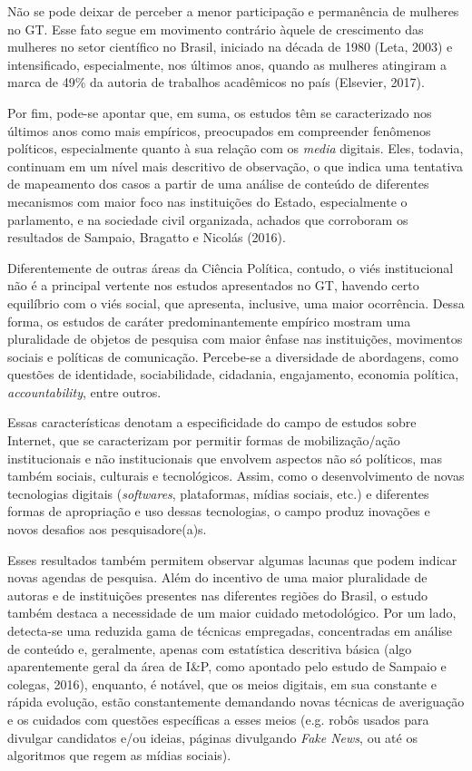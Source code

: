 Não se pode deixar de perceber a menor participação e permanência de
mulheres no GT. Esse fato segue em movimento contrário àquele de
crescimento das mulheres no setor científico no Brasil, iniciado na
década de 1980 (Leta, 2003) e intensificado, especialmente, nos últimos
anos, quando as mulheres atingiram a marca de 49\% da autoria de
trabalhos acadêmicos no país (Elsevier, 2017).

Por fim, pode-se apontar que, em suma, os estudos têm se caracterizado
nos últimos anos como mais empíricos, preocupados em compreender
fenômenos políticos, especialmente quanto à sua relação com os
\emph{media} digitais. Eles, todavia, continuam em um nível mais
descritivo de observação, o que indica uma tentativa de mapeamento dos
casos a partir de uma análise de conteúdo de diferentes mecanismos com
maior foco nas instituições do Estado, especialmente o parlamento, e na
sociedade civil organizada, achados que corroboram os resultados de
Sampaio, Bragatto e Nicolás (2016).

Diferentemente de outras áreas da Ciência Política, contudo, o viés
institucional não é a principal vertente nos estudos apresentados no GT,
havendo certo equilíbrio com o viés social, que apresenta, inclusive,
uma maior ocorrência. Dessa forma, os estudos de caráter
predominantemente empírico mostram uma pluralidade de objetos de
pesquisa com maior ênfase nas instituições, movimentos sociais e
políticas de comunicação. Percebe-se a diversidade de abordagens, como
questões de identidade, sociabilidade, cidadania, engajamento, economia
política, \emph{accountability}, entre outros.

Essas características denotam a especificidade do campo de estudos sobre
Internet, que se caracterizam por permitir formas de mobilização/ação
institucionais e não institucionais que envolvem aspectos não só
políticos, mas também sociais, culturais e tecnológicos. Assim, como o
desenvolvimento de novas tecnologias digitais (\emph{softwares},
plataformas, mídias sociais, etc.) e diferentes formas de apropriação e
uso dessas tecnologias, o campo produz inovações e novos desafios aos
pesquisadore(a)s.

Esses resultados também permitem observar algumas lacunas que podem
indicar novas agendas de pesquisa. Além do incentivo de uma maior
pluralidade de autoras e de instituições presentes nas diferentes
regiões do Brasil, o estudo também destaca a necessidade de um maior
cuidado metodológico. Por um lado, detecta-se uma reduzida gama de
técnicas empregadas, concentradas em análise de conteúdo e, geralmente,
apenas com estatística descritiva básica (algo aparentemente geral da
área de I\&P, como apontado pelo estudo de Sampaio e colegas, 2016),
enquanto, é notável, que os meios digitais, em sua constante e rápida
evolução, estão constantemente demandando novas técnicas de averiguação
e os cuidados com questões específicas a esses meios (e.g. robôs usados
para divulgar candidatos e/ou ideias, páginas divulgando \emph{Fake
News}, ou até os algoritmos que regem as mídias sociais).

